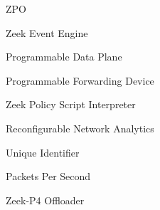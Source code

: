 
\begin{listofabbrv}{ZPO}
    \item[EE]  Zeek Event Engine
    \item[PDP] Programmable Data Plane
    \item[PFD] Programmable Forwarding Device
    \item[PSI] Zeek Policy Script Interpreter
    \item[RNA] Reconfigurable Network Analytics
    \item[UID] Unique Identifier
    \item[PPS] Packets Per Second
    \item[ZPO] Zeek-P4 Offloader
\end{listofabbrv}
